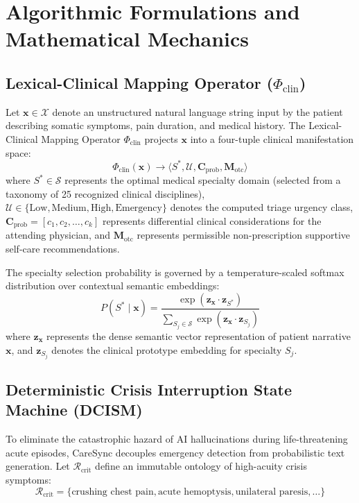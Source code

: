 \documentclass[conference]{IEEEtran}
\begin{document}
\section{Algorithmic Formulations and Mathematical Mechanics}

\subsection{Lexical-Clinical Mapping Operator ($\Phi_{\text{clin}}$)}
Let $\mathbf{x} \in \mathcal{X}$ denote an unstructured natural language string input by the patient describing somatic symptoms, pain duration, and medical history. The Lexical-Clinical Mapping Operator $\Phi_{\text{clin}}$ projects $\mathbf{x}$ into a four-tuple clinical manifestation space:
\begin{equation}
\Phi_{\text{clin}}(\mathbf{x}) \longrightarrow \langle S^*, \mathcal{U}, \mathbf{C}_{\text{prob}}, \mathbf{M}_{\text{otc}} \rangle
\end{equation}
where $S^* \in \mathcal{S}$ represents the optimal medical specialty domain (selected from a taxonomy of 25 recognized clinical disciplines), $\mathcal{U} \in \{\text{Low}, \text{Medium}, \text{High}, \text{Emergency}\}$ denotes the computed triage urgency class, $\mathbf{C}_{\text{prob}} = [c_1, c_2, \dots, c_k]$ represents differential clinical considerations for the attending physician, and $\mathbf{M}_{\text{otc}}$ represents permissible non-prescription supportive self-care recommendations.

The specialty selection probability is governed by a temperature-scaled softmax distribution over contextual semantic embeddings:
\begin{equation}
P(S^* \mid \mathbf{x}) = \frac{\exp(\mathbf{z}_\mathbf{x} \cdot \mathbf{z}_{S^*})}{\sum_{S_j \in \mathcal{S}} \exp(\mathbf{z}_\mathbf{x} \cdot \mathbf{z}_{S_j})}
\end{equation}
where $\mathbf{z}_\mathbf{x}$ represents the dense semantic vector representation of patient narrative $\mathbf{x}$, and $\mathbf{z}_{S_j}$ denotes the clinical prototype embedding for specialty $S_j$.

\subsection{Deterministic Crisis Interruption State Machine (DCISM)}
To eliminate the catastrophic hazard of AI hallucinations during life-threatening acute episodes, CareSync decouples emergency detection from probabilistic text generation. Let $\mathcal{R}_{\text{crit}}$ define an immutable ontology of high-acuity crisis symptoms:
\begin{equation}
\mathcal{R}_{\text{crit}} = \{\text{crushing chest pain}, \text{acute hemoptysis}, \text{unilateral paresis}, \dots\}
\end{equation}
\end{document}
